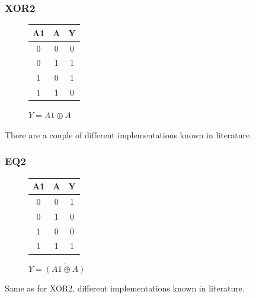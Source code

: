 \documentclass[aspectratio=169]{beamer}
\begin{document}
\begin{frame}
\frametitle{XOR2}
    \begin{figure}[h]
        \begin{center}
            \begin{circuitdiagram}{11}{6}
                \usgate
            \end{circuitdiagram}
            \hspace{2cm}
            \begin{tabular}{ c c|c } 
                A1 & A & Y \\ 
                \hline
                0 & 0 & 0 \\ 
                0 & 1 & 1 \\ 
                1 & 0 & 1 \\ 
                1 & 1 & 0 \\ 
            \end{tabular}
        \end{center}
    $Y = A1 \oplus A$
    \end{figure}
There are a couple of different implementations known in literature.
\end{frame}


\begin{frame}
\frametitle{EQ2}
    \begin{figure}[h]
        \begin{center}
            \begin{circuitdiagram}{11}{6}
                \usgate
            \end{circuitdiagram}
            \hspace{2cm}
            \begin{tabular}{ c c|c } 
                A1 & A & Y \\ 
                \hline
                0 & 0 & 1 \\ 
                0 & 1 & 0 \\ 
                1 & 0 & 0 \\ 
                1 & 1 & 1 \\ 
            \end{tabular}
        \end{center}
    $Y = \overline{ (A1 \oplus A) }$
    \end{figure}
Same as for XOR2, different implementations known in literature.
\end{frame}
\end{document}
